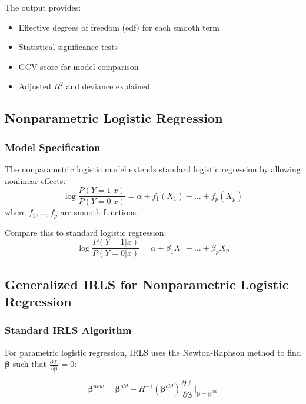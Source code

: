 \documentclass[12pt,a4paper]{article}
\begin{document}
The output provides:
\begin{itemize}
    \item Effective degrees of freedom (edf) for each smooth term
    \item Statistical significance tests
    \item GCV score for model comparison
    \item Adjusted $R^2$ and deviance explained
\end{itemize}

\subsection{Nonparametric Logistic Regression}

\subsubsection{Model Specification}

The nonparametric logistic model extends standard logistic regression by allowing nonlinear effects:
\begin{equation}
\log \frac{P(Y = 1|x)}{P(Y = 0|x)} = \alpha + f_1(X_1) + \ldots + f_p(X_p)
\end{equation}
where $f_1, \ldots, f_p$ are smooth functions.

Compare this to standard logistic regression:
\begin{equation}
\log \frac{P(Y = 1|x)}{P(Y = 0|x)} = \alpha + \beta_1 X_1 + \ldots + \beta_p X_p
\end{equation}

\subsection{Generalized IRLS for Nonparametric Logistic Regression}

\subsubsection{Standard IRLS Algorithm}

For parametric logistic regression, IRLS uses the Newton-Raphson method to find $\boldsymbol{\beta}$ such that $\frac{\partial \ell}{\partial \boldsymbol{\beta}} = 0$:

\begin{equation}
\boldsymbol{\beta}^{new} = \boldsymbol{\beta}^{old} - H^{-1}(\boldsymbol{\beta}^{old}) \frac{\partial \ell}{\partial \boldsymbol{\beta}}\Big|_{\boldsymbol{\beta}=\boldsymbol{\beta}^{old}}
\end{equation}
\end{document}
